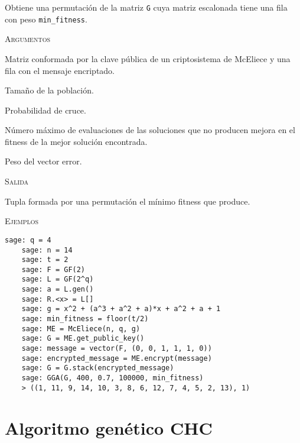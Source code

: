 \begin{description}[leftmargin=1em, font=\normalfont\ttfamily, style=nextline]
  \item[GGA(G, N, pc, max\_reinit, min\_fitness)] Obtiene una permutación de la matriz \texttt{G} cuya matriz escalonada tiene una fila con peso \texttt{min\_fitness}.

  \textsc{Argumentos}
  \begin{description}[font=\normalfont\ttfamily]
    \item[G] Matriz conformada por la clave pública de un criptosistema de McEliece y una fila con el mensaje encriptado.
    \item[N] Tamaño de la población.
    \item[pc] Probabilidad de cruce.
    \item[max\_reinit] Número máximo de evaluaciones de las soluciones que no producen mejora en el fitness de la mejor solución encontrada.
    \item[min\_fitness] Peso del vector error. 
  \end{description}

  \textsc{Salida}
  \begin{description}[font=\normalfont\ttfamily]
    \item[] Tupla formada por una permutación el mínimo fitness que produce.
  \end{description}

  \textsc{Ejemplos}
  \begin{lstlisting}[gobble=4]
    sage: q = 4
    sage: n = 14
    sage: t = 2
    sage: F = GF(2)
    sage: L = GF(2^q)
    sage: a = L.gen()
    sage: R.<x> = L[]
    sage: g = x^2 + (a^3 + a^2 + a)*x + a^2 + a + 1
    sage: min_fitness = floor(t/2)
    sage: ME = McEliece(n, q, g)
    sage: G = ME.get_public_key()
    sage: message = vector(F, (0, 0, 1, 1, 1, 0))
    sage: encrypted_message = ME.encrypt(message)
    sage: G = G.stack(encrypted_message)
    sage: GGA(G, 400, 0.7, 100000, min_fitness)
    > ((1, 11, 9, 14, 10, 3, 8, 6, 12, 7, 4, 5, 2, 13), 1)
  \end{lstlisting}
\end{description}

\section{Algoritmo genético CHC}

